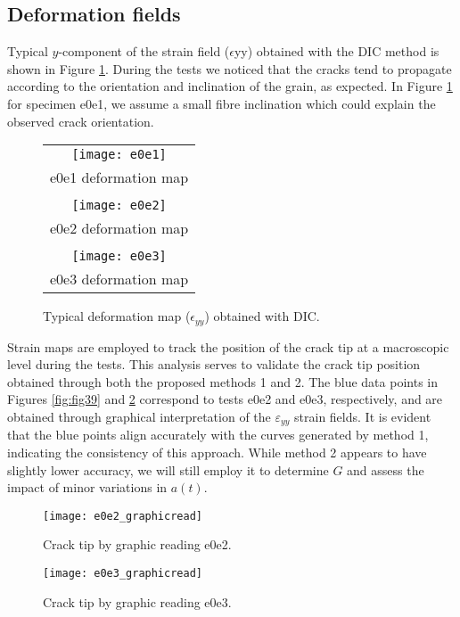 \subsection{Deformation fields}

Typical $y$-component of the strain field ($\epsilon$yy) obtained with the DIC method is shown in Figure \ref{fig:Strain_def}.
During the tests we noticed that the cracks tend to propagate according to the orientation and inclination of the grain, as expected.
In Figure \ref{fig:Strain_def} for specimen e0e1, we assume a small fibre inclination which could explain the observed crack orientation.

\begin{figure}[htp]
	\centering
	\begin{tabular}{c}
		\texttt{[image: e0e1]} \\
		e0e1 deformation map \\
		\\
		\texttt{[image: e0e2]} \\
		e0e2 deformation map \\
		\\
		\texttt{[image: e0e3]} \\
		e0e3 deformation map \\
	\end{tabular}
	\caption{Typical deformation map ($\epsilon_{yy}$) obtained with DIC.}
	\label{fig:Strain_def}
\end{figure}

Strain maps are employed to track the position of the crack tip at a macroscopic level during the tests. This analysis serves to validate the crack tip position obtained through both the proposed methods 1 and 2. The blue data points in Figures \ref{fig:fig39} and \ref{fig:fig40} correspond to tests e0e2 and e0e3, respectively, and are obtained through graphical interpretation of the $\varepsilon_{yy}$ strain fields. It is evident that the blue points align accurately with the curves generated by method 1, indicating the consistency of this approach. While method 2 appears to have slightly lower accuracy, we will still employ it to determine $G$ and assess the impact of minor variations in $a(t)$.

\begin{figure}[htp]
	\begin{minipage}[c]{.46\linewidth}
		\centering
		\texttt{[image: e0e2\_graphicread]}
		\caption{Crack tip by graphic reading e0e2.}
		\label{fig:fig39}
	\end{minipage}
	\hfill%
	\begin{minipage}[c]{.46\linewidth}
		\centering
		\texttt{[image: e0e3\_graphicread]}
		\caption{Crack tip by graphic reading e0e3.}
		\label{fig:fig40}
	\end{minipage}
\end{figure}


